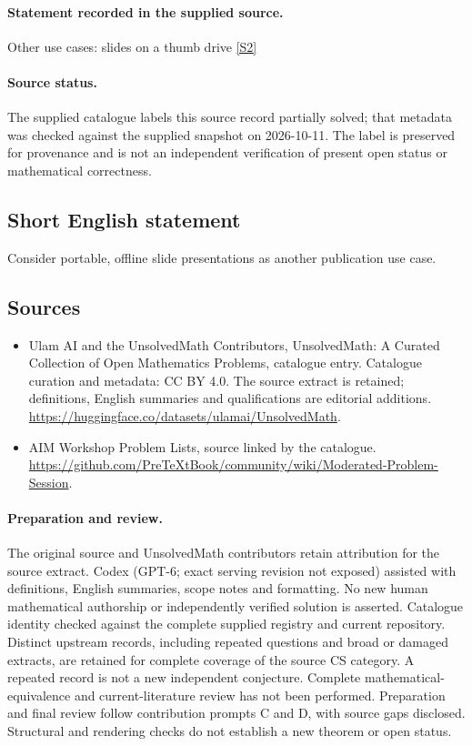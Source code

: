 \documentclass[11pt]{article}
\begin{document}
\paragraph{Statement recorded in the supplied source.}
Other use cases: slides on a thumb drive \href{https://github.com/PreTeXtBook/community/wiki/Moderated-Problem-Session}{[S2]}
\paragraph{Source status.}
The supplied catalogue labels this source record partially solved; that metadata was checked against the supplied snapshot on 2026-10-11. The label is preserved for provenance and is not an independent verification of present open status or mathematical correctness.
\subsection{Short English statement}
Consider portable, offline slide presentations as another publication use case.
\subsection{Sources}
\begin{itemize}
\item[S1] Ulam AI and the UnsolvedMath Contributors, UnsolvedMath: A Curated Collection of Open Mathematics Problems, catalogue entry. Catalogue curation and metadata: CC BY 4.0. The source extract is retained; definitions, English summaries and qualifications are editorial additions.
\url{https://huggingface.co/datasets/ulamai/UnsolvedMath}.
\item[S2] AIM Workshop Problem Lists, source linked by the catalogue.
\url{https://github.com/PreTeXtBook/community/wiki/Moderated-Problem-Session}.
\end{itemize}
\paragraph{Preparation and review.}
The original source and UnsolvedMath contributors retain attribution for the source extract. Codex (GPT-6; exact serving revision not exposed) assisted with definitions, English summaries, scope notes and formatting. No new human mathematical authorship or independently verified solution is asserted. Catalogue identity checked against the complete supplied registry and current repository. Distinct upstream records, including repeated questions and broad or damaged extracts, are retained for complete coverage of the source CS category. A repeated record is not a new independent conjecture. Complete mathematical-equivalence and current-literature review has not been performed. Preparation and final review follow contribution prompts C and D, with source gaps disclosed. Structural and rendering checks do not establish a new theorem or open status.
\label{end:statement}
\end{document}
